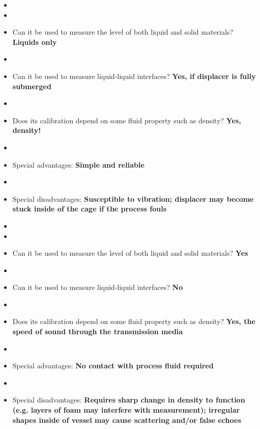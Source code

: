 \begin{itemize}
\goodbreak
\item{} 
\item\item{} Can it be used to measure the level of both liquid and solid materials? {\bf Liquids only}
\item\item{} Can it be used to measure liquid-liquid interfaces? {\bf Yes, if displacer is fully submerged}
\item\item{} Does its calibration depend on some fluid property such as density? {\bf Yes, density!}
\item\item{} Special advantages: {\bf Simple and reliable}
\item\item{} Special disadvantages: {\bf Susceptible to vibration; displacer may become stuck inside of the cage if the process fouls}
\end{itemize}

\vskip 10pt

\begin{itemize}
\goodbreak
\item{} 
\item\item{} Can it be used to measure the level of both liquid and solid materials? {\bf Yes}
\item\item{} Can it be used to measure liquid-liquid interfaces? {\bf No}
\item\item{} Does its calibration depend on some fluid property such as density? {\bf Yes, the speed of sound through the transmission media}
\item\item{} Special advantages: {\bf No contact with process fluid required}
\item\item{} Special disadvantages: {\bf Requires sharp change in density to function (e.g. layers of foam may interfere with measurement); irregular shapes inside of vessel may cause scattering and/or false echoes}
\end{itemize}

\vskip 10pt

